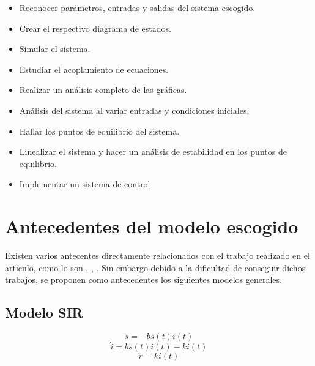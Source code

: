 \documentclass{article}
\begin{document}
\begin{itemize}
    \item Reconocer parámetros, entradas y salidas del sistema escogido.
    \item Crear el respectivo diagrama de estados.
    \item Simular el sistema.
    \item Estudiar el acoplamiento de ecuaciones.
    \item Realizar un análisis completo de las gráficas.
    \item Análisis del sistema al variar entradas y condiciones iniciales.
    \item Hallar los puntos de equilibrio del sistema.
    \item Linealizar el sistema y hacer un análisis de estabilidad en los puntos de equilibrio.
    \item Implementar un sistema de control
\end{itemize}

\section{Antecedentes del modelo escogido}

Existen varios antecentes directamente relacionados con el trabajo realizado en el
artículo, como lo son \cite{ieee1}, \cite{ieee2}, \cite{ieee3}. Sin embargo
debido a la dificultad de conseguir dichos trabajos, se proponen como
antecedentes los siguientes modelos generales.

\newpage

    \subsection{Modelo SIR}
        \Large
        $$\dot{s} = -b s(t) i(t)$$
        $$\dot{i} = b s(t) i(t) - k i(t)$$
        $$\dot{r} = k i(t)$$
        \normalsize

        \vspace{1cm}
\end{document}
